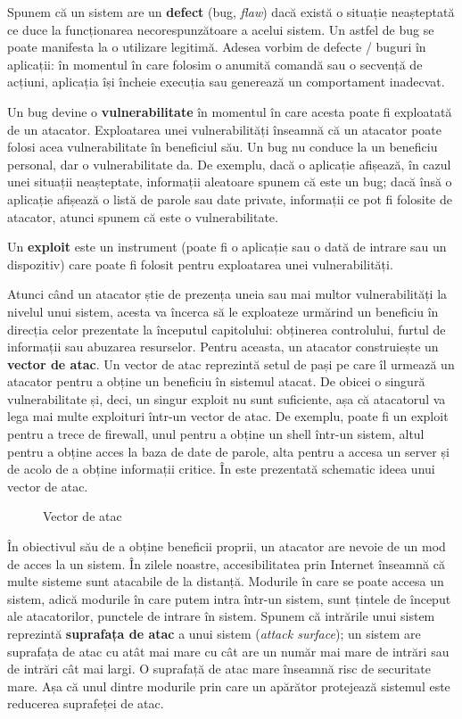 Spunem că un sistem are un \textbf{defect} (bug, \textit{flaw}) dacă există o situație neașteptată ce duce la funcționarea necorespunzătoare a acelui sistem. Un astfel de bug se poate manifesta la o utilizare legitimă. Adesea vorbim de defecte / buguri în aplicații: în momentul în care folosim o anumită comandă sau o secvență de acțiuni, aplicația își încheie execuția sau generează un comportament inadecvat.

Un bug devine o \textbf{vulnerabilitate} în momentul în care acesta poate fi exploatată de un atacator. Exploatarea unei vulnerabilități înseamnă că un atacator poate folosi acea vulnerabilitate în beneficiul său. Un bug nu conduce la un beneficiu personal, dar o vulnerabilitate da. De exemplu, dacă o aplicație afișează, în cazul unei situații neașteptate, informații aleatoare spunem că este un bug; dacă însă o aplicație afișează o listă de parole sau date private, informații ce pot fi folosite de atacator, atunci spunem că este o vulnerabilitate.

Un \textbf{exploit} este un instrument (poate fi o aplicație sau o dată de intrare sau un dispozitiv) care poate fi folosit pentru exploatarea unei vulnerabilități.

Atunci când un atacator știe de prezența uneia sau mai multor vulnerabilități la nivelul unui sistem, acesta va încerca să le exploateze urmărind un beneficiu în direcția celor prezentate la începutul capitolului: obținerea controlului, furtul de informații sau abuzarea resurselor. Pentru aceasta, un atacator construiește un \textbf{vector de atac}. Un vector de atac reprezintă setul de pași pe care îl urmează un atacator pentru a obține un beneficiu în sistemul atacat. De obicei o singură vulnerabilitate și, deci, un singur exploit nu sunt suficiente, așa că atacatorul va lega mai multe exploituri într-un vector de atac. De exemplu, poate fi un exploit pentru a trece de firewall, unul pentru a obține un shell într-un sistem, altul pentru a obține acces la baza de date de parole, alta pentru a accesa un server și de acolo de a obține informații critice. În  este prezentată schematic ideea unui vector de atac.

\begin{figure}[htbp]
  \centering
  \def\svgwidth{\columnwidth}
  
  \caption{Vector de atac}
  \label{fig:sec:attack-vector}
\end{figure}

În obiectivul său de a obține beneficii proprii, un atacator are nevoie de un mod de acces la un sistem. În zilele noastre, accesibilitatea prin Internet înseamnă că multe sisteme sunt atacabile de la distanță. Modurile în care se poate accesa un sistem, adică modurile în care putem intra într-un sistem, sunt țintele de început ale atacatorilor, punctele de intrare în sistem. Spunem că intrările unui sistem reprezintă \textbf{suprafața de atac} a unui sistem (\textit{attack surface}); un sistem are suprafața de atac cu atât mai mare cu cât are un număr mai mare de intrări sau de intrări cât mai largi. O suprafață de atac mare înseamnă risc de securitate mare. Așa că unul dintre modurile prin care un apărător protejează sistemul este reducerea suprafeței de atac.


